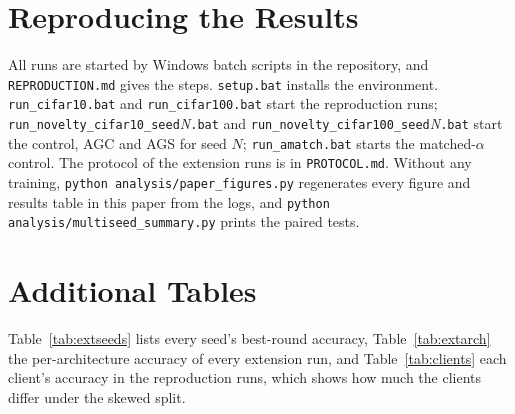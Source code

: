 \documentclass[conference]{IEEEtran}
\begin{document}
\section{Reproducing the Results}
All runs are started by Windows batch scripts in the repository, and \texttt{REPRODUCTION.md} gives the steps. \texttt{setup.bat} installs the environment. \texttt{run\_cifar10.bat} and \texttt{run\_cifar100.bat} start the reproduction runs; \texttt{run\_novelty\_cifar10\_seed}\textit{N}\texttt{.bat} and \texttt{run\_novelty\_cifar100\_seed}\textit{N}\texttt{.bat} start the control, AGC and AGS for seed $N$; \texttt{run\_amatch.bat} starts the matched-$\alpha$ control. The protocol of the extension runs is in \texttt{PROTOCOL.md}. Without any training, \texttt{python analysis/paper\_figures.py} regenerates every figure and results table in this paper from the logs, and \texttt{python analysis/multiseed\_summary.py} prints the paired tests.

\section{Additional Tables}

\begin{table}[t]
\centering
\caption{Extension runs: best-round averaged test accuracy (\%) for every seed.}
\label{tab:extseeds}
\footnotesize
\TabExtSeeds
\end{table}

\begin{table}[t]
\centering
\caption{Extension runs: mean test accuracy (\%) per client architecture at each run's best round.}
\label{tab:extarch}
\scriptsize
\TabExtArch
\end{table}

\begin{table}[t]
\centering
\caption{Reproduction runs: test accuracy (\%) of each client at the best round. Left: CIFAR-10. Right: CIFAR-100.}
\label{tab:clients}
\scriptsize
\setlength{\tabcolsep}{2.6pt}
\begin{minipage}[t]{0.49\textwidth}\centering\resizebox{\linewidth}{!}{\TabClientsTen}\end{minipage}\hfill
\begin{minipage}[t]{0.49\textwidth}\centering\resizebox{\linewidth}{!}{\TabClientsHundred}\end{minipage}
\end{table}

Table~\ref{tab:extseeds} lists every seed's best-round accuracy, Table~\ref{tab:extarch} the per-architecture accuracy of every extension run, and Table~\ref{tab:clients} each client's accuracy in the reproduction runs, which shows how much the clients differ under the skewed split.
\end{document}
